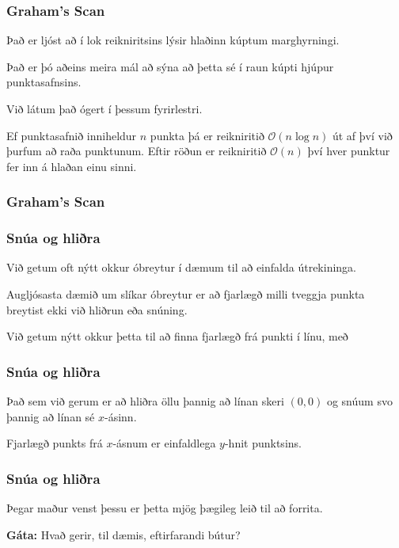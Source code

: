 {
	\frametitle{Graham's Scan}
	{
		\item<1-> Það er ljóst að í lok reikniritsins lýsir hlaðinn kúptum marghyrningi.
		\item<2-> Það er þó aðeins meira mál að sýna að þetta sé í raun kúpti hjúpur punktasafnsins.
		\item<3-> Við látum það ógert í þessum fyrirlestri.
		\item<4-> Ef punktasafnið inniheldur $n$ punkta þá er reikniritið $\mathcal{O}(n \log n)$ út af því við þurfum að 
			raða punktunum. Eftir röðun er reikniritið $\mathcal{O}(n)$ því hver punktur fer inn á hlaðan einu sinni.
	}
}

{
	\frametitle{Graham's Scan}
}

{
	\frametitle{Snúa og hliðra}
	{
		\item<1-> Við getum oft nýtt okkur óbreytur í dæmum til að einfalda útrekininga.
		\item<2-> Augljósasta dæmið um slíkar óbreytur er að fjarlægð milli tveggja punkta breytist ekki við hliðrun eða snúning.
		\item<3-> Við getum nýtt okkur þetta til að finna fjarlægð frá punkti í línu, með
		\item<4->[] 
	}
}

{
	\frametitle{Snúa og hliðra}
	{
		\item<1->[] 
		\item<2-> Það sem við gerum er að hliðra öllu þannig að línan skeri $(0, 0)$ og snúum svo þannig að línan sé $x$-ásinn.
		\item<3-> Fjarlægð punkts frá $x$-ásnum er einfaldlega $y$-hnit punktsins.
	}
}

{
	\frametitle{Snúa og hliðra}
	{
		\item<1-> Þegar maður venst þessu er þetta mjög þægileg leið til að forrita. 
		\item<2-> {\bf Gáta:} Hvað gerir, til dæmis, eftirfarandi bútur?
		\item<3->[] 
	}
}

{
}


